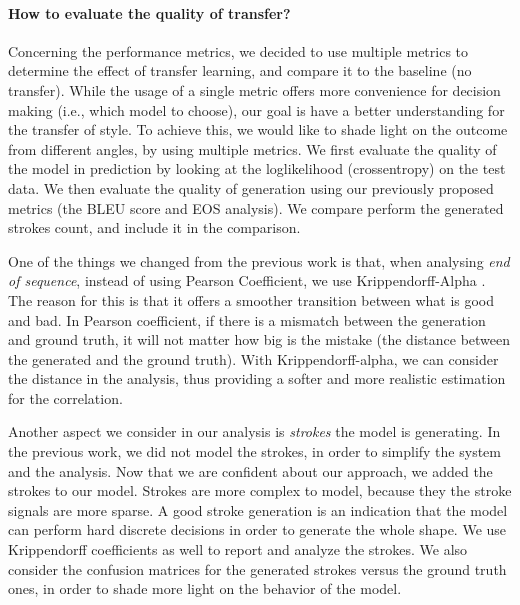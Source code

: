   \paragraph{How to evaluate the quality of transfer?} Concerning the performance metrics, we decided to use multiple metrics to determine the effect of transfer learning, and compare it to the baseline (no transfer). While the usage of a single metric offers more convenience for decision making (i.e., which model to choose), our goal is have a better understanding for the transfer of style. To achieve this, we would like to shade light on the outcome from different angles, by using multiple metrics. We first evaluate the quality of the model in prediction by looking at the loglikelihood (crossentropy) on the test data. We then evaluate the quality of generation using our previously proposed metrics (the BLEU score and EOS analysis). We compare perform the generated strokes count, and include it in the comparison.

  \par One of the things we changed from the previous work is that, when analysing \textit{end of sequence}, instead of using Pearson Coefficient, we use Krippendorff-Alpha \citep{krippendorff2011computing}. The reason for this is that it offers a smoother transition between what is good and bad. In Pearson coefficient, if there is a mismatch between the generation and ground truth, it will not matter how big is the mistake (the distance between the generated and the ground truth). With Krippendorff-alpha, we can consider the distance in the analysis, thus providing a softer and more realistic estimation for the correlation.

  \par Another aspect we consider in our analysis is \textit{strokes} the model is generating. In the previous work, we did not model the strokes, in order to simplify the system and the analysis. Now that we are confident about our approach, we added the strokes to our model. Strokes are more complex to model, because they the stroke signals are more sparse. A good stroke generation is an indication that the model can perform hard discrete decisions in order to generate the whole shape. We use Krippendorff coefficients as well to report and analyze the strokes. We also consider the confusion matrices for the generated strokes versus the ground truth ones, in order to shade more light on the behavior of the model.

